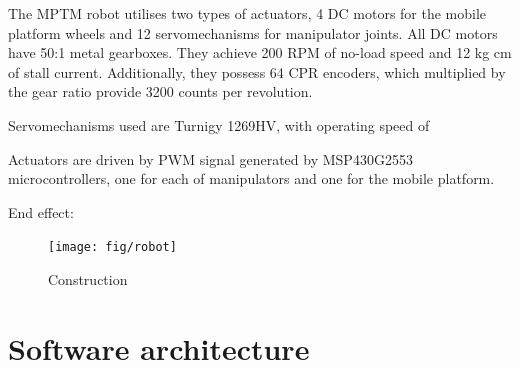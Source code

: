 The MPTM robot utilises two types of actuators, 4 DC motors for the mobile platform wheels and 12 servomechanisms for manipulator joints. 
All DC motors have 50:1 metal gearboxes. They achieve 200 RPM of no-load speed and 12 kg cm of stall current. Additionally, they possess 64 CPR encoders, which multiplied by the gear ratio provide 3200 counts per revolution.

Servomechanisms used are Turnigy 1269HV, with operating speed of 

Actuators are driven by PWM signal generated by MSP430G2553 microcontrollers, one for each of manipulators and one for the mobile platform.

End effect:
\begin{figure}[H]
\centering
\texttt{[image: fig/robot]}
\caption{Construction}
\end{figure}

\section{Software architecture}
\label{sec:soft}

